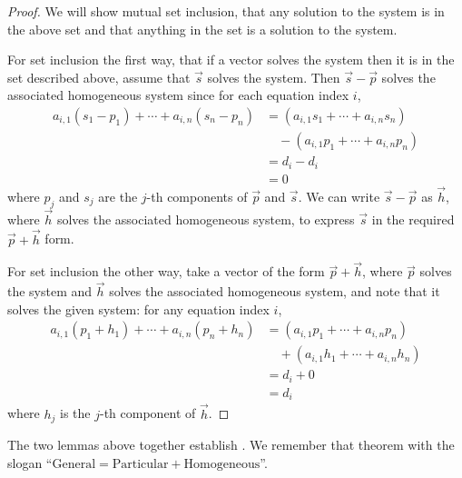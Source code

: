 \begin{proof}
We will show mutual set inclusion, that any solution to the system is in
the above set and that anything in the set is a solution to the 
system.

For set inclusion the first way, that if a vector solves the system
then it is in the set described above, 
assume that \( \vec{s} \) solves the system.
Then \( \vec{s}-\vec{p} \) solves the associated
homogeneous system since for each equation index \( i \),
\begin{equation*}
  \begin{split}
  a_{i,1}(s_1-p_1)+\cdots+a_{i,n}(s_n-p_n)
  &=(a_{i,1}s_1+\cdots+a_{i,n}s_n)       \\
  &\quad -(a_{i,1}p_1+\cdots+a_{i,n}p_n)  \\
  &=d_i-d_i                 \\
  &=0
  \end{split}
\end{equation*}
where \( p_j \) and \( s_j \) are the \( j \)-th components of
\( \vec{p} \) and \( \vec{s} \).
We can write \( \vec{s}-\vec{p} \) as \( \vec{h} \),
where \( \vec{h} \) solves the associated homogeneous system, to 
express \( \vec{s} \) in the required \( \vec{p}+\vec{h} \) form.

For set inclusion the other way, take a vector of the form $\vec{p}+\vec{h}$,
where \( \vec{p} \) solves the system and \( \vec{h} \) solves the
associated homogeneous system, and note that it solves the given system:
for any equation index $i$, 
\begin{equation*}
  \begin{split}
  a_{i,1}(p_1+h_1)+\cdots+a_{i,n}(p_n+h_n)
  &=(a_{i,1}p_1+\cdots+a_{i,n}p_n)      \\
  &\quad+(a_{i,1}h_1+\cdots+a_{i,n}h_n)  \\
  &=d_i+0                                \\
  &=d_i
  \end{split}
\end{equation*}
where \( h_j \) is the \( j \)-th component of \( \vec{h} \).
\end{proof}
The two lemmas above together establish .
We remember that theorem with the slogan 
``\( \text{General} = \text{Particular} + \text{Homogeneous} \)''.

